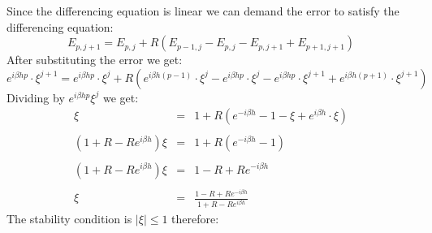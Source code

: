 \documentclass[11pt, a4paper]{article}
\begin{document}
\noindent Since the differencing equation is linear we can demand the error to satisfy the differencing equation:
\begin{equation}
    E_{p,j+1}=E_{p,j}+R\left(E_{p-1,j}-E_{p,j}-E_{p,j+1}+E_{p+1,j+1}\right)
\end{equation}
After substituting the error we get:
\begin{equation}
    e^{i\beta h p}\cdot\xi^{j+1}=e^{i\beta h p}\cdot\xi^j+R\left(e^{i\beta h \left(p-1\right)}\cdot\xi^j-e^{i\beta h p}\cdot\xi^j-e^{i\beta h p}\cdot\xi^{j+1}+e^{i\beta h \left(p+1\right)}\cdot\xi^{j+1}\right)
\end{equation}
Dividing by $e^{i\beta h p}\xi^j$ we get:
\begin{equation}
    \begin{array}{rcl}
        \xi & = & 1+R\left(e^{-i\beta h}-1-\xi+e^{i\beta h }\cdot\xi\right) \\\\
        \left(1+R-Re^{i\beta h}\right)\xi & = & 1+R\left(e^{-i\beta h}-1\right) \\\\
        \left(1+R-Re^{i\beta h}\right)\xi & = & 1-R+Re^{-i\beta h} \\\\
        \xi & = & \displaystyle \frac{1-R+Re^{-i\beta h}}{1+R-Re^{i\beta h}}
    \end{array}
\end{equation}
The stability condition is $\left|\xi\right|\le1$ therefore:
\end{document}
